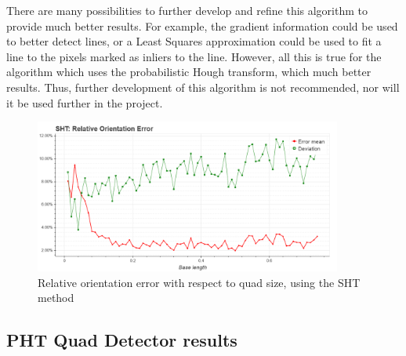 There are many possibilities to further develop and refine this algorithm to provide much better results.
For example, the gradient information could be used to better detect lines, or a Least Squares approximation could be used to fit a line to the pixels marked as inliers to the line.
However, all this is true for the algorithm which uses the probabilistic Hough transform, which much better results.
Thus, further development of this algorithm is not recommended, nor will it be used further in the project.
\begin{figure}[ht]
	\centering
	\includegraphics[width=0.9\textwidth]{figures/plots/sht_relative_orientation_error.png}
	\caption{Relative orientation error with respect to quad size, using the SHT method}
	\label{fig:shtRelOrientErr}
\end{figure}

\clearpage\subsection{PHT Quad Detector results}

